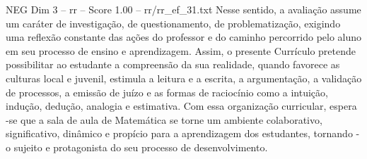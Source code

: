 \begin{textsample}{NEG Dim 3 – rr – Score 1.00 – rr/rr\_ef\_31.txt}
Nesse sentido, a avaliação assume um caráter de investigação, de questionamento, de problematização, exigindo uma reflexão constante das ações do professor e do caminho percorrido pelo aluno em seu processo de ensino e aprendizagem.
Assim, o presente Currículo pretende possibilitar ao estudante a compreensão da sua realidade, quando favorece as culturas local e juvenil, estimula a leitura e a escrita, a argumentação, a validação de processos, a emissão de juízo e as formas de raciocínio como a intuição, indução, dedução, analogia e estimativa.
Com essa organização curricular, espera -se que a sala de aula de Matemática se torne um ambiente colaborativo, significativo, dinâmico e propício para a aprendizagem dos estudantes, tornando -o sujeito e protagonista do seu processo de desenvolvimento.

\end{textsample}
